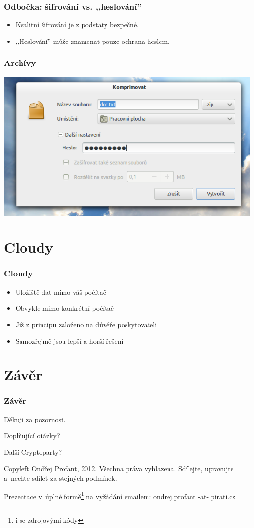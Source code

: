 \documentclass[xetex]{beamer}
\begin{document}
\begin{frame}
	\frametitle{Odbočka: šifrování vs. ,,heslování''} 
	\begin{itemize} 
   		\item Kvalitní šifrování je z podstaty bezpečné.
   		\item ,,Heslování'' může znamenat pouze ochrana heslem.
	\end{itemize} 
\end{frame}

\begin{frame}
 \frametitle{Archívy} 
\includegraphics[scale=0.6]{pic/zip-pass.png}
\end{frame}

\section{Cloudy}

\begin{frame}
 \frametitle{Cloudy} 
\begin{itemize} 
   \item Uložiště dat mimo váš počítač
   \item Obvykle mimo konkrétní počítač
   \item Již z principu založeno na důvěře poskytovateli
   \item Samozřejmě jsou lepší a horší řešení
 \end{itemize} 
\end{frame}

\section{Závěr}

\begin{frame}
  \frametitle{Závěr}
	Děkuji za pozornost.

	\bigskip
	
	Doplňující otázky?

	\bigskip
	
	Další Cryptoparty?

	\bigskip

	\bigskip

	\scriptsize
Copyleft Ondřej Profant, 2012. Všechna práva vyhlazena. Sdílejte, upravujte a~nechte sdílet za stejných podmínek. 

Prezentace v~úplné formě\footnote{i se zdrojovými kódy} na vyžádání emailem: ondrej.profant -at- pirati.cz 
\end{frame}
\end{document}
